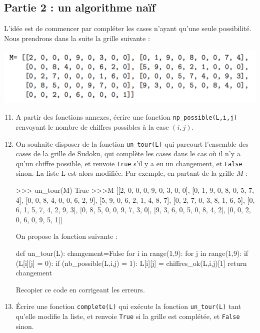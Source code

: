 \documentclass[a4paper,french,11pt,twoside]{VcCours}
\begin{document}
\subsection*{Partie 2 : un algorithme naïf}
L'idée est de commencer par compléter les cases n'ayant qu'une seule possibilité. Nous prendrons dans la suite la grille suivante : 

\begin{center}
\includegraphics[scale=0.45]{im2}
\end{center}

\begin{enumerate}\setcounter{enumi}{10}
\item A partir des fonctions annexes, écrire une fonction {\tt np\_possible(L,i,j)} renvoyant le nombre de chiffres possibles à la case $(i,j)$.
\item On souhaite disposer de la fonction {\tt un\_tour(L)} qui parcourt l'ensemble des cases de la grille de Sudoku, qui complète les cases dans le cas où il n'y a qu'un chiffre possible, et renvoie {\tt True} s'il y a eu un changement, et {\tt False} sinon. La liste L est alors modifiée. Par exemple, en partant de la grille $M$ :
\begin{Python*}
>>> un_tour(M)
True
>>>M
[[2, 0, 0, 0, 9, 0, 3, 0, 0], [0, 1, 9, 0, 8, 0, 5, 7, 4],
[0, 0, 8, 4, 0, 0, 6, 2, 9], [5, 9, 0, 6, 2, 1, 4, 8, 7],
[0, 2, 7, 0, 3, 8, 1, 6, 5], [0, 6, 1, 5, 7, 4, 2, 9, 3],
[0, 8, 5, 0, 0, 9, 7, 3, 0], [9, 3, 6, 0, 5, 0, 8, 4, 2],
[0, 0, 2, 0, 6, 0, 9, 5, 1]]
\end{Python*}
On propose la fonction suivante :
\begin{Python}
def un_tour(L):
    changement=False
    for i in range(1,9):
        for j in range(1,9):
            if (L[i][j] = 0):
                if (nb_possible(L,i,j) = 1):
                    L[i][j] = chiffres_ok(L,i,j)[1]
    return changement
\end{Python}
Recopier ce code en corrigeant les erreurs.
\item Écrire une fonction {\tt complete(L)} qui exécute la fonction {\tt un\_tour(L)} tant qu'elle modifie la liste, et renvoie {\tt True} si la grille est complétée, et {\tt False} sinon.
\end{enumerate}
\end{document}
